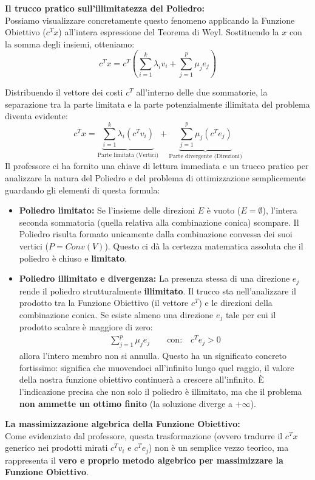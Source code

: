 \documentclass[12pt, a4paper]{article}
\begin{document}
	\textbf{Il trucco pratico sull'illimitatezza del Poliedro:}\\
	Possiamo visualizzare concretamente questo fenomeno applicando la Funzione Obiettivo ($c^T x$) all'intera espressione del Teorema di Weyl. Sostituendo la $x$ con la somma degli insiemi, otteniamo:
	\[
	c^T x = c^T \left( \sum_{i=1}^k \lambda_i v_i + \sum_{j=1}^p \mu_j e_j \right)
	\]
	
	\vspace{0.2cm}
	Distribuendo il vettore dei costi $c^T$ all'interno delle due sommatorie, la separazione tra la parte limitata e la parte potenzialmente illimitata del problema diventa evidente:
	\[
	c^T x = \underbrace{\sum_{i=1}^k \lambda_i (c^T v_i)}_{\text{Parte limitata (Vertici)}} + \underbrace{\sum_{j=1}^p \mu_j (c^T e_j)}_{\text{Parte divergente (Direzioni)}}
	\]
	Il professore ci ha fornito una chiave di lettura immediata e un trucco pratico per analizzare la natura del Poliedro e del problema di ottimizzazione semplicemente guardando gli elementi di questa formula:
	\begin{itemize}
		\item \textbf{Poliedro limitato:} Se l'insieme delle direzioni $E$ è vuoto ($E = \emptyset$), l'intera seconda sommatoria (quella relativa alla combinazione conica) scompare. Il Poliedro risulta formato unicamente dalla combinazione convessa dei suoi vertici ($P = Conv(V)$). Questo ci dà la certezza matematica assoluta che il poliedro è chiuso e \textbf{limitato}.
		\item \textbf{Poliedro illimitato e divergenza:} La presenza stessa di una direzione $e_j$ rende il poliedro strutturalmente \textbf{illimitato}. Il trucco sta nell'analizzare il prodotto tra la Funzione Obiettivo (il vettore $c^T$) e le direzioni della combinazione conica. Se esiste almeno una direzione $e_j$ tale per cui il prodotto scalare è maggiore di zero:
		\[
		\begin{aligned}
			\sum_{j=1}^p \mu_j e_j \qquad \text{con:} \quad c^T e_j > 0
		\end{aligned}
		\]
		allora l'intero membro non si annulla. Questo ha un significato concreto fortissimo: significa che muovendoci all'infinito lungo quel raggio, il valore della nostra funzione obiettivo continuerà a crescere all'infinito. È l'indicazione precisa che non solo il poliedro è illimitato, ma che il problema \textbf{non ammette un ottimo finito} (la soluzione diverge a $+\infty$).
	\end{itemize}
	
	\vspace{0.3cm}
	\textbf{La massimizzazione algebrica della Funzione Obiettivo:}\\
	Come evidenziato dal professore, questa trasformazione (ovvero tradurre il $c^T x$ generico nei prodotti mirati $c^T v_i$ e $c^T e_j$) non è un semplice vezzo teorico, ma rappresenta il \textbf{vero e proprio metodo algebrico per massimizzare la Funzione Obiettivo}. 
	
\end{document}
